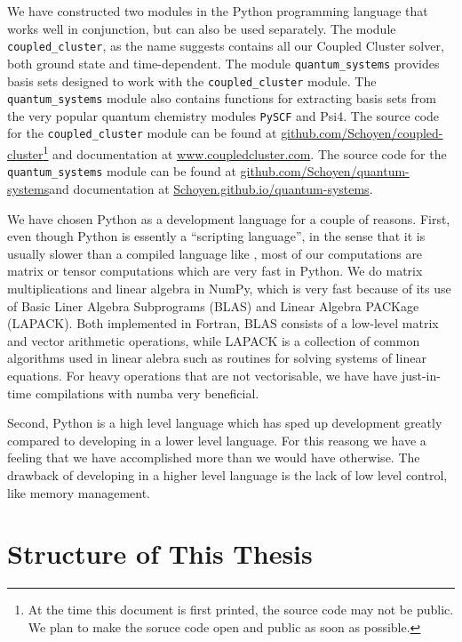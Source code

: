     We have constructed two modules in the Python programming language that works
    well in conjunction, but 
    can also be used separately. The module \lstinline{coupled_cluster}, as the  
    name suggests contains all our Coupled Cluster solver, both ground state and 
    time-dependent. The module \lstinline{quantum_systems} provides basis sets
    designed to work with the \lstinline{coupled_cluster} module. The 
    \lstinline{quantum_systems} module also contains functions for extracting basis sets 
    from the very popular quantum chemistry modules \lstinline{PySCF}\cite{PYSCF}
    and Psi4\cite{parrish2017psi4}. The source code for the \lstinline{coupled_cluster} module 
    can be found at
    \url{github.com/Schoyen/coupled-cluster}\footnote{At the time this document is 
    first printed, the source code may not be public. We plan to make the soruce code 
    open and public as soon as possible.} and documentation at 
    \url{www.coupledcluster.com}.
    The source code for the \lstinline{quantum_systems} module 
    can be found at
    \url{github.com/Schoyen/quantum-systems}and documentation at 
    \url{Schoyen.github.io/quantum-systems}.

    We have chosen Python as a development language for a couple of reasons. 
    First, even though Python is essently a  ``scripting language'', in the sense 
    that it is usually slower than a compiled language like \CC,
    most of our computations are matrix or tensor computations which are very fast
    in Python. We do matrix multiplications and linear algebra in NumPy, which 
    is very fast because of its use of Basic Liner Algebra Subprograms (BLAS) 
    and Linear Algebra PACKage (LAPACK).
    Both implemented in Fortran, BLAS consists of a low-level matrix and vector 
    arithmetic operations, while LAPACK is a collection of common algorithms 
    used in linear alebra such as routines for solving systems of linear 
    equations. For heavy operations that are not vectorisable, we have have  
    just-in-time compilations with numba very beneficial.

    Second, Python is a high level language which has sped up development greatly 
    compared to developing in a lower level language. For this reasong we 
    have a feeling that we have accomplished more than we would have 
    otherwise. The drawback of developing in a higher level language is the 
    lack of low level control, like memory management. 

\section{Structure of This Thesis}

